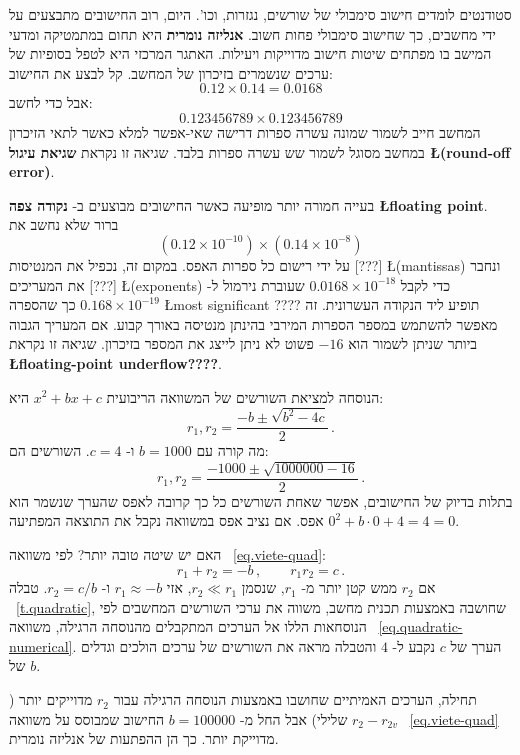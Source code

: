 סטודנטים לומדים חישוב סימבולי של שורשים, נגזרות, וכו'. היום, רוב החישובים מתבצעים על ידי מחשבים, כך שחישוב סימבולי פחות חשוב. 
\textbf{אנליזה נומרית}
היא תחום במתמטיקה ומדעי המישב בו מפתחים שיטות חישוב מדוייקות ויעילות. האתגר המרכזי היא לטפל בסופיות של ערכים שנשמרים בזיכרון של המחשב. קל לבצע את החישוב:
\[0.12\times 0.14=0.0168\]
אבל כדי לחשב:
\[0.123456789\times 0.123456789\]
המחשב חייב לשמור שמונה עשרה ספרות דרישה שאי-אפשר למלא כאשר לתאי הזיכרון במחשב מסוגל לשמור שש עשרה ספרות בלבד. שגיאה זו נקראת 
\textbf{שגיאת עיגול \L{(round-off error)}}.

בעייה חמורה יותר מופיעה כאשר החישובים מבוצעים ב-%
\textbf{נקודה צפה \L{\small floating point}}.
ברור שלא נחשב את
\[(0.12\times 10^{-10})\times (0.14\times 10^{-8})\]
על ידי רישום כל ספרות האפס. במקום זה, נכפיל את המנטיסות [???]
\L{\small (mantissas)}
ונחבר את המעריכים [???] 
\L{\small (exponents)}
כדי לקבל
$0.0168\times 10^{-18}$
שעוברת נירמול ל-%
$0.168\times 10^{-19}$
כך שהספרה 
\L{\small most significant ????}
תופיע ליד הנקודה העשרונית. זה מאפשר להשתמש במספר הספרות המירבי בהינתן מנטיסה באורך קבוע. אם המעריך הגבוה ביותר שניתן לשמור הוא 
$-16$
פשוט לא ניתן לייצג את המספר בזיכרון. שגיאה זו נקראת 
\textbf{\L{floating-point underflow????}}.

הנוסחה למציאת השורשים של המשוואה הריבועית
$x^2+bx+c$ 
היא:
\begin{equation}
r_1, r_2 = \frac{-b\pm\sqrt{b^2-4c}}{2}\,.\label{eq.quadratic-numerical}
\end{equation}
מה קורה עם
$b=1000$
ו-%
$c=4$.
השורשים הם:
\[
r_1, r_2 = \frac{-1000\pm\sqrt{1000000-16}}{2}\,.
\]
בתלות בדיוק של החישובים, אפשר שאחת השורשים כל כך קרובה לאפס שהערך שנשמר הוא אפס. אם נציב אפס במשוואה נקבל את התוצאה המפתיעה
$0^2+b\cdot 0 +4= 4= 0$.

האם יש שיטה טובה יותר? לפי משוואה%
~\ref{eq.viete-quad}:
\[
r_1+r_2 = -b\,,\quad\quad r_1r_2=c\,.
\]
אם
$r_2$
ממש קטן יותר מ-%
$r_1$,
שנסמן
$r_2\ll r_1$,
אזי
$r_1\approx -b$
ו-%
$r_2=c/b$.
טבלה%
~\ref{t.quadratic},
שחושבה באמצעות תכנית מחשב, משווה את ערכי השורשים המחשבים לפי הנוסחאות הללו אל הערכים המתקבלים מהנוסחה הרגילה, משוואה%
~\ref{eq.quadratic-numerical}.
הערך של
$c$
נקבע ל-%
$4$
והטבלה מראה את השורשים של ערכים הולכים וגדלים של
$b$.

תחילה, הערכים האמיתיים שחושבו באמצעות הנוסחה הרגילה עבור
$r_2$
מדוייקים יותר
($r_2-r_{2v}$ שלילי)
אבל החל מ-%
$b=100000$
החישוב שמבוסס על משוואה%
~\ref{eq.viete-quad}
מדוייקת יותר. כך הן ההפתעות של אנליזה נומרית.


